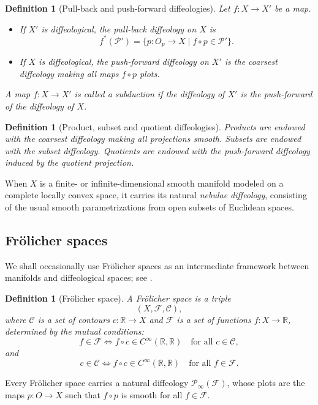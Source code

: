\documentclass[11pt]{amsart}
\newtheorem{definition}[theorem]{Definition}
\begin{document}
\begin{definition}[Pull-back and push-forward diffeologies]
Let \(f:X\to X'\) be a map.
\begin{itemize}
\item If \(X'\) is diffeological, the pull-back diffeology on \(X\) is
\[
f^*(\mathcal P')=\{p:O_p\to X\mid f\circ p\in\mathcal P'\}.
\]
\item If \(X\) is diffeological, the push-forward diffeology on \(X'\) is the coarsest diffeology making all maps \(f\circ p\) plots.
\end{itemize}
A map \(f:X\to X'\) is called a \emph{subduction} if the diffeology of \(X'\) is the push-forward of the diffeology of \(X\).
\end{definition}

\begin{definition}[Product, subset and quotient diffeologies]
Products are endowed with the coarsest diffeology making all projections smooth. Subsets are endowed with the subset diffeology. Quotients are endowed with the push-forward diffeology induced by the quotient projection.
\end{definition}

When \(X\) is a finite- or infinite-dimensional smooth manifold modeled on a complete locally convex space, it carries its natural \emph{nebulae diffeology}, consisting of the usual smooth parametrizations from open subsets of Euclidean spaces.

\subsection{Frölicher spaces}

We shall occasionally use Frölicher spaces as an intermediate framework between manifolds and diffeological spaces; see \cite{KM,Ma2006-3,Watts2012Thesis,BIgKWa2014}.

\begin{definition}[Frölicher space]
A \emph{Frölicher space} is a triple
\[
(X,\mathcal F,\mathcal C),
\]
where \(\mathcal C\) is a set of contours \(c:\mathbb R\to X\) and \(\mathcal F\) is a set of functions \(f:X\to\mathbb R\), determined by the mutual conditions:
\[
f\in\mathcal F \iff f\circ c\in C^\infty(\mathbb R,\mathbb R)
\quad\text{for all } c\in\mathcal C,
\]
and
\[
c\in\mathcal C \iff f\circ c\in C^\infty(\mathbb R,\mathbb R)
\quad\text{for all } f\in\mathcal F.
\]
\end{definition}

Every Frölicher space carries a natural diffeology \(\mathcal P_\infty(\mathcal F)\), whose plots are the maps \(p:O\to X\) such that \(f\circ p\) is smooth for all \(f\in\mathcal F\).
\end{document}

